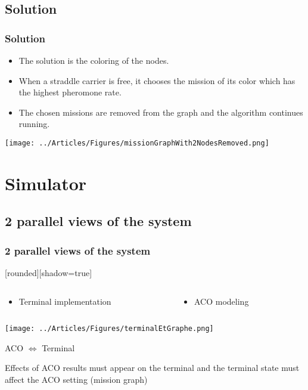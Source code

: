 \documentclass{beamer}
\begin{document}
\subsection*{Solution}
\begin{frame}
\frametitle{Solution}

	\begin{itemize}
	  \item The solution is the coloring of the nodes.
	  \item When a straddle carrier is free, it chooses the mission of its color which has the highest pheromone rate.
	  \item The chosen missions are removed from the graph and the algorithm continues running.
	\end{itemize}
	
	\begin{center}
		\texttt{[image: ../Articles/Figures/missionGraphWith2NodesRemoved.png]}
	\end{center}
\end{frame}
\section{Simulator}
\subsection*{2 parallel views of the system}
\begin{frame}
\frametitle{2 parallel views of the system}
	[rounded][shadow=true]
 	\begin{columns}
	 	\begin{column}[l]{6cm}
	 		\begin{itemize}
				 \item Terminal implementation
			\end{itemize}
		\end{column}
		\begin{column}[r]{6cm}
			\begin{itemize}
				  \item ACO modeling\cite{Dutot2007}
			\end{itemize}
		\end{column}
 	\end{columns}
	\begin{center} \texttt{[image: ../Articles/Figures/terminalEtGraphe.png]} \end{center}

	\begin{block}{ACO $\Longleftrightarrow$ Terminal}
		\begin{center}
			Effects of ACO results must appear on the terminal and the terminal state must affect the ACO setting (mission graph)
	 	\end{center}
	\end{block}
\end{frame}
\end{document}
